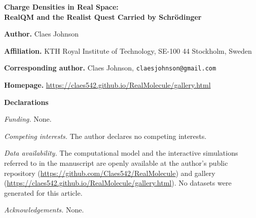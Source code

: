\documentclass[11pt]{article}
\begin{document}
\thispagestyle{empty}

\begin{center}
{\Large\bfseries Charge Densities in Real Space:\\[2pt]
RealQM and the Realist Quest Carried by Schr\"odinger}
\end{center}

\vspace{1.5em}

\noindent\textbf{Author.} Claes Johnson

\medskip
\noindent\textbf{Affiliation.} KTH Royal Institute of Technology, SE-100 44 Stockholm, Sweden

\medskip
\noindent\textbf{Corresponding author.} Claes Johnson, \texttt{claesjohnson@gmail.com}

\medskip
\noindent\textbf{Homepage.} \url{https://claes542.github.io/RealMolecule/gallery.html}

\vspace{2em}

\noindent\textbf{Declarations}

\medskip
\noindent\emph{Funding.} None.

\medskip
\noindent\emph{Competing interests.} The author declares no competing interests.

\medskip
\noindent\emph{Data availability.} The computational model and the interactive simulations referred to in
the manuscript are openly available at the author's public repository
(\url{https://github.com/Claes542/RealMolecule}) and gallery
(\url{https://claes542.github.io/RealMolecule/gallery.html}). No datasets were generated for this article.

\medskip
\noindent\emph{Acknowledgements.} None.

\vspace{2em}
\end{document}
